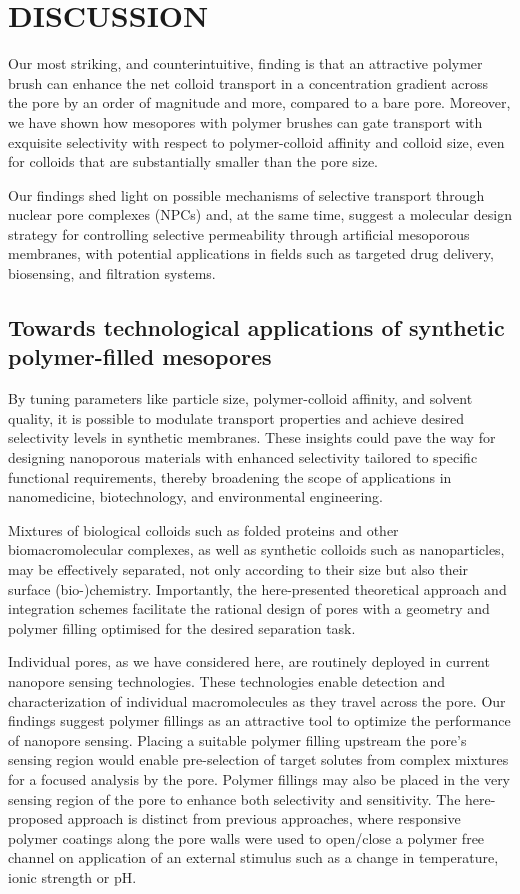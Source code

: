 \documentclass[12pt, a4paper]{article}
\begin{document}
\section{DISCUSSION}

Our most striking, and counterintuitive, finding is that an attractive polymer brush can enhance the net colloid transport in a concentration gradient across the pore by an order of magnitude and more, compared to a bare pore.
Moreover, we have shown how mesopores with polymer brushes can gate transport with exquisite selectivity with respect to polymer-colloid affinity and colloid size, even for colloids that are substantially smaller than the pore size.

Our findings shed light on possible mechanisms of selective transport through nuclear pore complexes (NPCs) and, at the same time, suggest a molecular design strategy for controlling selective permeability through artificial mesoporous membranes, with potential applications in fields such as targeted drug delivery, biosensing, and filtration systems.

\subsection{Towards technological applications of synthetic polymer-filled mesopores}

By tuning parameters like particle size, polymer-colloid affinity, and solvent quality, it is possible to modulate transport properties and achieve desired selectivity levels in synthetic membranes.
These insights could pave the way for designing nanoporous materials with enhanced selectivity tailored to specific functional requirements, thereby broadening the scope of applications in nanomedicine, biotechnology, and environmental engineering.

Mixtures of biological colloids such as folded proteins and other biomacromolecular complexes, as well as synthetic colloids such as nanoparticles, may be effectively separated, not only according to their size but also their surface (bio-)chemistry.
Importantly, the here-presented theoretical approach and integration schemes facilitate the rational design of pores with a geometry and polymer filling optimised for the desired separation task.

Individual pores, as we have considered here, are routinely deployed in current nanopore sensing technologies.
These technologies enable detection and characterization of individual macromolecules as they travel across the pore.
Our findings suggest polymer fillings as an attractive tool to optimize the performance of nanopore sensing.
Placing a suitable polymer filling upstream the pore's sensing region would enable pre-selection of target solutes from complex mixtures for a focused analysis by the pore.
Polymer fillings may also be placed in the very sensing region of the pore to enhance both selectivity and sensitivity.
The here-proposed approach is distinct from previous approaches, where responsive polymer coatings along the pore walls were used to open/close a polymer free channel on application of an external stimulus such as a change in temperature, ionic strength or pH. 
\end{document}
